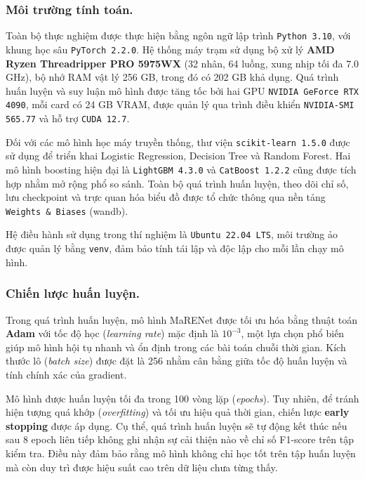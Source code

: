 \subsubsection{Môi trường tính toán.}

Toàn bộ thực nghiệm được thực hiện bằng ngôn ngữ lập trình \texttt{Python\,3.10}, với khung học sâu \texttt{PyTorch\,2.2.0}. Hệ thống máy trạm sử dụng bộ xử lý \textbf{AMD Ryzen Threadripper PRO 5975WX} (32 nhân, 64 luồng, xung nhịp tối đa 7.0 GHz), bộ nhớ RAM vật lý 256 GB, trong đó có 202 GB khả dụng. Quá trình huấn luyện và suy luận mô hình được tăng tốc bởi hai GPU \texttt{NVIDIA GeForce RTX 4090}, mỗi card có 24 GB VRAM, được quản lý qua trình điều khiển \texttt{NVIDIA-SMI 565.77} và hỗ trợ \texttt{CUDA 12.7}.

Đối với các mô hình học máy truyền thống, thư viện \texttt{scikit-learn\,1.5.0} được sử dụng để triển khai Logistic Regression, Decision Tree và Random Forest. Hai mô hình boosting hiện đại là \texttt{LightGBM\,4.3.0} và \texttt{CatBoost\,1.2.2} cũng được tích hợp nhằm mở rộng phổ so sánh. Toàn bộ quá trình huấn luyện, theo dõi chỉ số, lưu checkpoint và trực quan hóa biểu đồ được tổ chức thông qua nền tảng \texttt{Weights \& Biases} (wandb).

Hệ điều hành sử dụng trong thí nghiệm là \texttt{Ubuntu 22.04 LTS}, môi trường ảo được quản lý bằng \texttt{venv}, đảm bảo tính tái lập và độc lập cho mỗi lần chạy mô hình.

\subsubsection{Chiến lược huấn luyện.}

Trong quá trình huấn luyện, mô hình MaRENet được tối ưu hóa bằng thuật toán \textbf{Adam} với tốc độ học (\textit{learning rate}) mặc định là \(10^{-3}\), một lựa chọn phổ biến giúp mô hình hội tụ nhanh và ổn định trong các bài toán chuỗi thời gian. Kích thước lô (\textit{batch size}) được đặt là 256 nhằm cân bằng giữa tốc độ huấn luyện và tính chính xác của gradient.

Mô hình được huấn luyện tối đa trong 100 vòng lặp (\textit{epochs}). Tuy nhiên, để tránh hiện tượng quá khớp (\textit{overfitting}) và tối ưu hiệu quả thời gian, chiến lược \textbf{early stopping} được áp dụng. Cụ thể, quá trình huấn luyện sẽ tự động kết thúc nếu sau 8 epoch liên tiếp không ghi nhận sự cải thiện nào về chỉ số F1-score trên tập kiểm tra. Điều này đảm bảo rằng mô hình không chỉ học tốt trên tập huấn luyện mà còn duy trì được hiệu suất cao trên dữ liệu chưa từng thấy.


